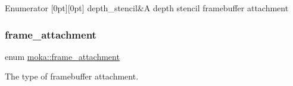 \begin{DoxyEnumFields}{Enumerator}
[0pt][0pt]{}\mbox{\label{namespacemoka_a0a44ecbb877dec1107d9915dc95c58d1a4cc2150334d039ce9f2a6b7e8e285e3e}} 
depth\+\_\+stencil&A depth stencil framebuffer attachment \\
\hline

\end{DoxyEnumFields}
\mbox{\label{namespacemoka_a0a44ecbb877dec1107d9915dc95c58d1}} 
\subsubsection{\texorpdfstring{frame\_attachment}{frame\_attachment}\hspace{0.1cm}{\footnotesize\ttfamily [2/2]}}
{\footnotesize\ttfamily enum \mbox{\hyperlink{namespacemoka_a0a44ecbb877dec1107d9915dc95c58d1}{moka\+::frame\+\_\+attachment}}\hspace{0.3cm}{\ttfamily [strong]}}



The type of framebuffer attachment. 

